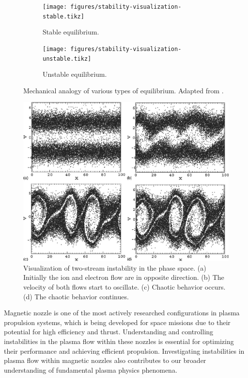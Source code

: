 \begin{figure}[htbp]
	\centering
	\begin{subfigure}[b]{0.5\textwidth}
		\centering
		\texttt{[image: figures/stability-visualization-stable.tikz]}
		\caption{Stable equilibrium.}
	\end{subfigure}%
	\begin{subfigure}[b]{0.5\textwidth}
		\centering
		\texttt{[image: figures/stability-visualization-unstable.tikz]}
		\caption{Unstable equilibrium.}
	\end{subfigure}
	\caption{Mechanical analogy of various types of equilibrium. Adapted from \cite{chen_introduction_2016}.}
	\label{fig:stability-visualization}
\end{figure}

\begin{figure}[htbp]
	\centering
	\includegraphics[width=0.7\linewidth]{figures/two-stream-instability}
	\caption{Visualization of two-stream instability in the phase space. (a) Initially the ion and electron flow are in opposite direction. (b) The velocity of both flows start to oscillate. (c) Chaotic behavior occurs. (d) The chaotic behavior continues. \cite{ha_nonlinear_2011}}
	\label{fig:two-stream-instability}
\end{figure}

Magnetic nozzle is one of the most actively researched configurations in plasma propulsion systems, which is being developed for space missions due to their potential for high efficiency and thrust. Understanding and controlling instabilities in the plasma flow within these nozzles is essential for optimizing their performance and achieving efficient propulsion. Investigating instabilities in plasma flow within magnetic nozzles also contributes to our broader understanding of fundamental plasma physics phenomena.


